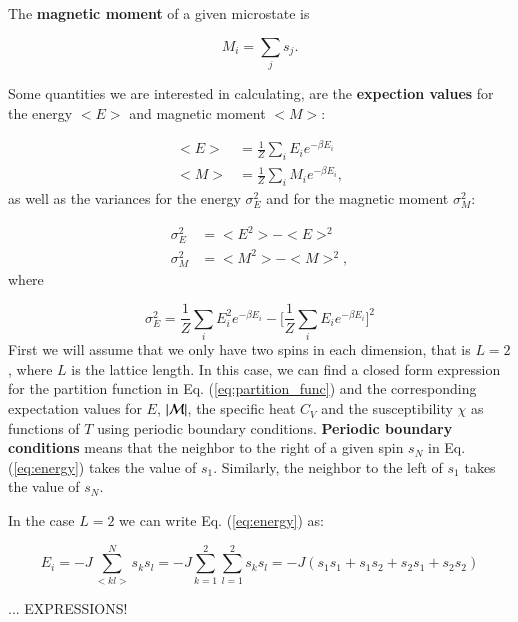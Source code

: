 \documentclass{article}
\begin{document}
\begin{multicols}{2}
The \textbf{magnetic moment} of a given microstate is

\begin{equation}
	M_i = \sum_j s_j.
\end{equation} 

Some quantities we are interested in calculating, are the \textbf{expection values} for the energy $<E>$ and magnetic moment $<M>$:

\begin{equation}
\begin{aligned}
	<E> &= \frac{1}{Z} \sum_i E_i e^{- \beta E_i} \\
	<M> &= \frac{1}{Z} \sum_i M_i e^{- \beta E_i},
\end{aligned}
\end{equation}
as well as the variances for the energy $\sigma_E^2$ and for the magnetic moment $\sigma_M^2$:

\begin{equation}
\begin{aligned}
	\sigma_E^2 &= <E^2> - <E>^2 \\
	\sigma_M^2 &= <M^2> - <M>^2,
\end{aligned}
\end{equation}
where

\begin{equation}
	\sigma_E^2 = \frac{1}{Z} \sum_i E_i^2 e^{- \beta E_i} - \bigg[ \frac{1}{Z} \sum_i E_i e^{- \beta E_i} \bigg]^2
\end{equation}
First we will assume that we only have two spins in each dimension, that is $L = 2$, where $L$ is the lattice length. In this case, we can find a closed form expression for the partition function in Eq. (\ref{eq:partition_func}) and the corresponding expectation values for $E$, $|{\cal M}|$, the specific heat $C_V$ and the susceptibility $\chi$ as functions of $T$ using periodic boundary conditions. \textbf{Periodic boundary conditions} means that the neighbor to the right of a given spin $s_N$ in Eq. (\ref{eq:energy}) takes the value of $s_1$. Similarly, the neighbor to the left of $s_1$ takes the value of $s_N$. 

In the case $L = 2$ we can write Eq. (\ref{eq:energy}) as:

\begin{equation}\label{eq:energy2}
	E_i = -J \sum_{<kl>}^{N}s_k s_l = -J \sum_{k = 1}^{2} \sum_{l = 1}^{2} s_k s_l = - J (s_1 s_1 + s_1 s_2 + s_2 s_1 + s_2 s_2)
\end{equation}

... EXPRESSIONS! 







\end{multicols}
\end{document}
